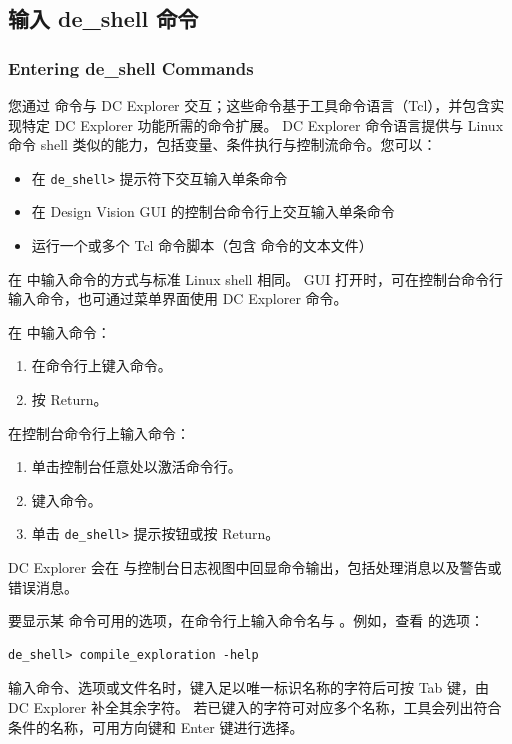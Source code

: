 \subsection{输入 de\_shell 命令}
\subsubsection*{Entering de\_shell Commands}

您通过  命令与 DC Explorer 交互；这些命令基于工具命令语言（Tcl），并包含实现特定 DC Explorer 功能所需的命令扩展。
DC Explorer 命令语言提供与 Linux 命令 shell 类似的能力，包括变量、条件执行与控制流命令。您可以：
\begin{itemize}
  \item 在 \texttt{de\_shell>} 提示符下交互输入单条命令
  \item 在 Design Vision GUI 的控制台命令行上交互输入单条命令
  \item 运行一个或多个 Tcl 命令脚本（包含  命令的文本文件）
\end{itemize}

在  中输入命令的方式与标准 Linux shell 相同。
GUI 打开时，可在控制台命令行输入命令，也可通过菜单界面使用 DC Explorer 命令。

在  中输入命令：
\begin{enumerate}
  \item 在命令行上键入命令。
  \item 按 Return。
\end{enumerate}

在控制台命令行上输入命令：
\begin{enumerate}
  \item 单击控制台任意处以激活命令行。
  \item 键入命令。
  \item 单击 \texttt{de\_shell>} 提示按钮或按 Return。
\end{enumerate}

DC Explorer 会在  与控制台日志视图中回显命令输出，包括处理消息以及警告或错误消息。

要显示某  命令可用的选项，在命令行上输入命令名与 。例如，查看  的选项：
\begin{lstlisting}
de_shell> compile_exploration -help
\end{lstlisting}

输入命令、选项或文件名时，键入足以唯一标识名称的字符后可按 Tab 键，由 DC Explorer 补全其余字符。
若已键入的字符可对应多个名称，工具会列出符合条件的名称，可用方向键和 Enter 键进行选择。

